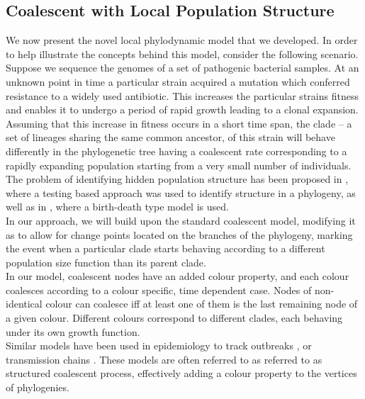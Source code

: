 \documentclass{ieeeaccess}
\theoremstyle{definition}
\begin{document}
\subsection{Coalescent with Local Population Structure}
We now present the novel local phylodynamic model that we developed.
In order to help illustrate the concepts behind this model, consider the following scenario.\\
Suppose we sequence the genomes of a set of pathogenic bacterial samples. 
At an unknown point in time a particular strain acquired a mutation which conferred resistance to a widely used antibiotic. This increases the particular strains fitness and enables it to undergo a period of rapid growth leading to a clonal expansion. Assuming that this increase in fitness occurs in a short time span, the clade -- a set of lineages sharing the same common ancestor, of this strain will behave differently in the phylogenetic tree having a coalescent rate corresponding to a rapidly expanding population starting from a very small number of individuals.\\
The problem of identifying hidden population structure has been proposed in \cite{volz_identification_nodate}, where a testing based approach was used to identify structure in a phylogeny, as well as in \cite{barido-sottani_multitype_2020}, where a birth-death type model is used.\\
In our approach, we will build upon the standard coalescent model, modifying it as to allow for change points located on the branches of the phylogeny, marking the event when a particular clade starts behaving according to a different population size function than its parent clade.\\
In our model, coalescent nodes have an added colour property, and each colour coalesces according to a colour specific, time dependent case. Nodes of non-identical colour can coalesce iff at least one of them is the last remaining node of a given colour.
Different colours correspond to different clades, each behaving under its own growth function.\\
Similar models have been used in epidemiology to track outbreaks \cite{maio_scotti_2016}, or transmission chains \cite{didelot_genomic_2017}.
These models are often referred to as referred to as structured coalescent process, effectively adding a colour property to the vertices of phylogenies.
\end{document}
